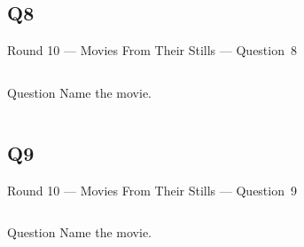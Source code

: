 \documentclass[11pt]{beamer}
\begin{document}
\subsection*{Q8}
\begin{frame}[t]{Round 10 --- Movies From Their Stills --- \mbox{Question 8}}
    \vspace{-0.5em}
    \begin{columns}[T,totalwidth=\linewidth]
        \begin{column}{0.32\linewidth}
            \begin{block}{Question}
                Name the movie.
            \end{block}
        \end{column}
        \begin{column}{0.65\linewidth}
            \begin{center}
                \texttt{[image: \{Images/die-hard]}.jpg}
            \end{center}
        \end{column}
    \end{columns}
\end{frame}
\subsection*{Q9}
\begin{frame}[t]{Round 10 --- Movies From Their Stills --- \mbox{Question 9}}
    \vspace{-0.5em}
    \begin{columns}[T,totalwidth=\linewidth]
        \begin{column}{0.32\linewidth}
            \begin{block}{Question}
                Name the movie.
            \end{block}
        \end{column}
        \begin{column}{0.65\linewidth}
            \begin{center}
                \texttt{[image: \{Images/strangelove]}.jpg}
            \end{center}
        \end{column}
    \end{columns}
\end{frame}
\end{document}
